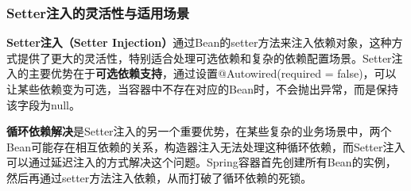 \begin{Shaded}
\begin{Highlighting}[]
\CommentTok{/**}
 \CommentTok{*} 
 \CommentTok{*} 
 \CommentTok{*} 
 \CommentTok{*}    \CommentTok{{-}} 
 \CommentTok{*}    \CommentTok{{-}} 
 \CommentTok{*} 
 \CommentTok{*}  
 \CommentTok{*}    \CommentTok{{-}} 
 \CommentTok{*}    \CommentTok{{-}} 
 \CommentTok{*} 
 \CommentTok{*}  
 \CommentTok{*}    \CommentTok{{-}} 
 \CommentTok{*}    \CommentTok{{-}} 
 \CommentTok{*} 
 \CommentTok{*}  
 \CommentTok{*}    \CommentTok{{-}} 
 \CommentTok{*}    \CommentTok{{-}} 
 \CommentTok{*} 
 \CommentTok{*} 
 \CommentTok{*}    \CommentTok{{-}}
 \CommentTok{*}    \CommentTok{{-}} 
 \CommentTok{*/}
\end{Highlighting}
\end{Shaded}

\subsubsection{Setter注入的灵活性与适用场景}\label{setterux6ce8ux5165ux7684ux7075ux6d3bux6027ux4e0eux9002ux7528ux573aux666f}

\textbf{Setter注入（Setter Injection）}通过Bean的setter方法来注入依赖对象，这种方式提供了更大的灵活性，特别适合处理可选依赖和复杂的依赖配置场景。Setter注入的主要优势在于\textbf{可选依赖支持}，通过设置@Autowired(required = false)，可以让某些依赖变为可选，当容器中不存在对应的Bean时，不会抛出异常，而是保持该字段为null。

\textbf{循环依赖解决}是Setter注入的另一个重要优势，在某些复杂的业务场景中，两个Bean可能存在相互依赖的关系，构造器注入无法处理这种循环依赖，而Setter注入可以通过延迟注入的方式解决这个问题。Spring容器首先创建所有Bean的实例，然后再通过setter方法注入依赖，从而打破了循环依赖的死锁。

